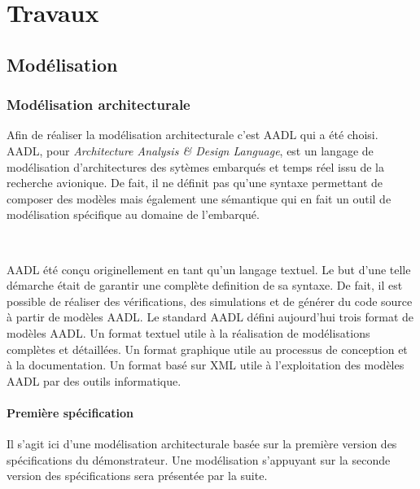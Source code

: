 \chapter{Travaux}
  \section{Modélisation}
    \subsection{Modélisation architecturale}
      
      Afin de réaliser la modélisation architecturale c'est AADL\cite{aadl} qui a
      été choisi. AADL, pour {\it Architecture Analysis \& Design Language}, est
      un langage de modélisation d'architectures des sytèmes embarqués et temps
      réel issu de la recherche avionique. De fait, il ne définit pas qu'une
      syntaxe permettant de composer des modèles mais également une sémantique
      qui en fait un outil de modélisation spécifique au domaine de l'embarqué.

      ~

      AADL été conçu originellement en tant qu'un langage textuel. Le but d'une
      telle démarche était de garantir une complète definition de sa syntaxe. De
      fait, il est possible de réaliser des vérifications, des simulations et de
      générer du code source à partir de modèles AADL. Le standard AADL défini
      aujourd'hui trois format de modèles AADL. Un format textuel utile à la
      réalisation de modélisations complètes et détaillées. Un format graphique
      utile au processus de conception et à la documentation. Un format basé sur
      XML utile à l'exploitation des modèles AADL par des outils informatique.

    \subsubsection{Première spécification}

      Il s'agit ici d'une modélisation architecturale basée sur la première
      version des spécifications du démonstrateur. Une modélisation s'appuyant
      sur la seconde version des spécifications sera présentée par la suite.
      
      ~
  
